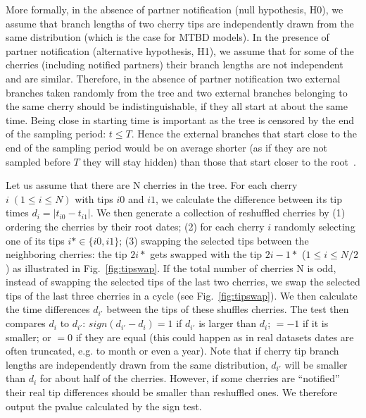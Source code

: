 \documentclass[a4paper,10pt]{article}
\begin{document}
More formally, in the absence of partner notification (null hypothesis, H0), we assume that branch lengths of two cherry tips are independently drawn from the same distribution (which is the case for MTBD models). In the presence of partner notification (alternative hypothesis, H1), we assume that for some of the cherries (including notified partners) their branch lengths are not independent and are similar. Therefore, in the absence of partner notification two external branches taken randomly from the tree and two external branches belonging to the same cherry should be indistinguishable, if they all start at about the same time. Being close in starting time is important as the tree is censored by the end of the sampling period: $t \leq T$. Hence the external branches that start close to the end of the sampling period would be on average shorter (as if they are not sampled before $T$ they will stay hidden) than those that start closer to the root~\citep{mooersBranchLengthsBirth2012}. %

Let us assume that there are N cherries in the tree. For each cherry $i\;(1 \leq i \leq N)$ with tips $i0$ and $i1$, we calculate the difference between its tip times $d_i = |t_{i0} - t_{i1}|$. We then generate a collection of reshuffled cherries by (1) ordering the cherries by their root dates; (2) for each cherry $i$ randomly selecting one of its tips $i* \in \{i0, i1\}$; (3) swapping the selected tips between the neighboring cherries: the tip $2i*$ gets swapped with the tip $2i-1*$ ($1 \leq i \leq N / 2$) as illustrated in Fig.~\ref{fig:tipswap}. If the total number of cherries N is odd, instead of swapping the selected tips of the last two cherries, we swap the selected tips of the last three cherries in a cycle (see Fig.~\ref{fig:tipswap}). We then calculate the time differences $d_{i'}$ between the tips of these shuffles cherries. 
The test then compares $d_i$ to $d_{i'}$: $sign(d_{i'} - d_i) = 1$ if $d_{i'}$ is larger than $d_i$; $= -1$ if it is smaller; or $= 0$ if they are equal (this could happen as in real datasets dates are often truncated, e.g. to month or even a year). Note that if cherry tip branch lengths are independently drawn from the same distribution, $d_{i'}$ will be smaller than $d_i$ for about half of the cherries. However, if some cherries are ``notified'' their real tip differences should be smaller than reshuffled ones. We therefore output the pvalue calculated by the sign test.
\end{document}
